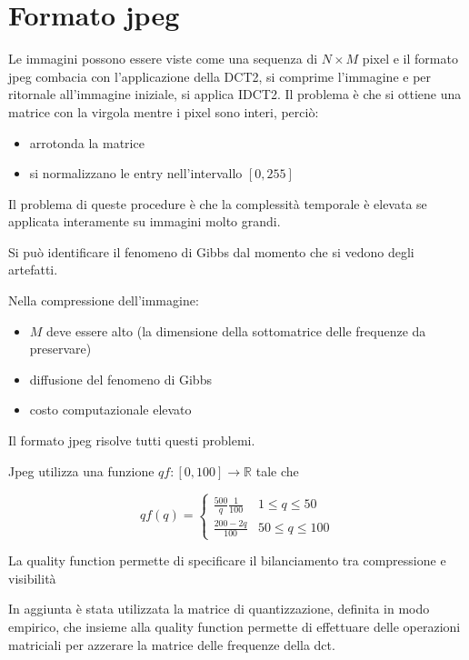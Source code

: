 \chapter{Formato jpeg}
Le immagini possono essere viste come una sequenza di $N \times M$ pixel e 
il formato jpeg combacia con l'applicazione della DCT2, si comprime l'immagine 
e per ritornale all'immagine iniziale, si applica IDCT2. Il problema è che si ottiene 
una matrice con la virgola mentre i pixel sono interi, perciò:
\begin{itemize}
    \item arrotonda la matrice
    \item si normalizzano le entry nell'intervallo $[0,255]$ 
\end{itemize}

\begin{nota}
    Il problema di queste procedure è che la complessità temporale è elevata se 
    applicata interamente su immagini molto grandi.
\end{nota}

\begin{nota}
    Si può identificare il fenomeno di Gibbs dal momento che si vedono degli artefatti.
\end{nota}

Nella compressione dell'immagine:
\begin{itemize}
    \item $M$ deve essere alto (la dimensione della sottomatrice delle frequenze 
    da preservare)
    \item diffusione del fenomeno di Gibbs
    \item costo computazionale elevato
\end{itemize}

Il formato jpeg risolve tutti questi problemi. 

Jpeg utilizza una funzione $qf:[0,100] \to \mathbb{R}$ tale che

$$qf(q)=\begin{cases}
    \frac{500}{q}\frac{1}{100}&1\le q \le 50\\
    \frac{200-2q}{100} & 50 \le q \le 100
\end{cases}$$

La quality function permette di specificare il bilanciamento tra compressione e 
visibilità 

In aggiunta è stata utilizzata la matrice di quantizzazione, definita in modo empirico, 
che insieme alla quality function permette di effettuare delle operazioni matriciali 
per azzerare la matrice delle frequenze della dct.




